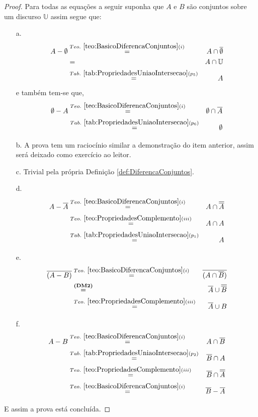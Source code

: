 \begin{proof}
  Para todas as equações a seguir suponha que $A$ e $B$ são conjuntos sobre um discurso $\mathbb{U}$ assim segue que:
  \begin{itemize}
      \item[a.]
		  \begin{eqnarray*}
			  A - \emptyset & \stackrel{Teo. \  \ref{teo:BasicoDiferencaConjuntos}(i)}{=}& A \cap \overline{\emptyset} \\
			  & = & A \cap \mathbb{U} \\
			  & \stackrel{Tab. \ \ref{tab:PropriedadesUniaoIntersecao}(p_5)}{=} & A
		  \end{eqnarray*}
		  e também tem-se que,
		  \begin{eqnarray*}
			  \emptyset - A &\stackrel{Teo. \  \ref{teo:BasicoDiferencaConjuntos}(i)}{=}& \emptyset \cap \overline{A}\\
			  &\stackrel{Tab. \ \ref{tab:PropriedadesUniaoIntersecao}(p_6)}{=}& \emptyset
		  \end{eqnarray*}
      \item[b.] A prova tem um raciocínio similar a demonstração do item anterior, assim será deixado como exercício ao leitor.
		  \item[c.] Trivial pela própria Definição \ref{def:DiferencaConjuntos}.
      \item[d.]
      \begin{eqnarray*}
			  A - \overline{A} &\stackrel{Teo. \  \ref{teo:BasicoDiferencaConjuntos}(i)}{=}& A \cap \overline{\overline{A}}\\
			  &\stackrel{Teo. \ \ref{teo:PropriedadesComplemento}(iii)}{=}& A \cap A\\
			  &\stackrel{Tab. \ \ref{tab:PropriedadesUniaoIntersecao}(p_1)}{=}& A
		  \end{eqnarray*}
      \item[e.]
      \begin{eqnarray*}
			  \overline{(A - B)} &\stackrel{Teo. \  \ref{teo:BasicoDiferencaConjuntos}(i)}{=}& \overline{(A \cap \overline{B})}\\
			  &\stackrel{\textbf{(DM2)}}{=}& \overline{A} \cup \overline{\overline{B}}\\
			  &\stackrel{Teo. \ \ref{teo:PropriedadesComplemento}(iii)}{=}&  \overline{A} \cup  B
		  \end{eqnarray*}
      \item[f.]
      \begin{eqnarray*}
			  A - B &\stackrel{Teo. \  \ref{teo:BasicoDiferencaConjuntos}(i)}{=}& A \cap \overline{B}\\
			  &\stackrel{Tab. \ \ref{tab:PropriedadesUniaoIntersecao}(p_2)}{=}& \overline{B} \cap A\\
			  &\stackrel{Teo. \ \ref{teo:PropriedadesComplemento}(iii)}{=}& \overline{B} \cap \overline{\overline{A}}\\
			  &\stackrel{Teo. \  \ref{teo:BasicoDiferencaConjuntos}(i)}{=}&  \overline{B} - \overline{A}
		  \end{eqnarray*}
  \end{itemize}
  E assim a prova está concluída.
\end{proof}


